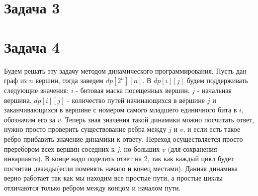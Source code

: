\documentclass{article}
\begin{document}
	
	\section*{Задача 3}
	
	\section*{Задача 4}
	Будем решать эту задачу методом динамического программирования. Пусть дан граф из $n$ вершин, тогда заведем $dp[2^n][n]$. В $dp[i][j]$ будем поддерживать следующие значения: $i$ - битовая маска посещенных вершин, $j$ - начальная вершина, $dp[i][j]$ - количество путей начинающихся в вершине $j$ и заканчивающихся в вершине с номером самого младшего единичного бита в $i$, обозначим его за $v$. Теперь зная значения такой динамики можно посчитать ответ, нужно просто проверить существование ребра между $j$ и $v$, и если есть такое ребро прибавить значение динамики к ответу. Переход осуществляется просто преребором всех вершин соседних к $j$, но больших $v$ (для сохранения инварианта). В конце надо поделить ответ на $2$, так как каждый цикл будет посчитан дважды(если поменять начало и конец местами). Данная динамика верно работает так как мы находим все простые пути, а простые циклы отличаются только ребром между концом и началом пути.
	
	
\end{document}
